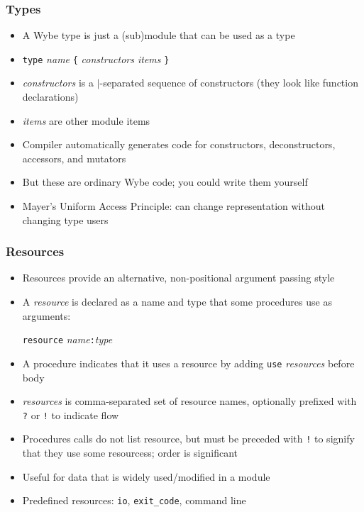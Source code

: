 \documentclass[12pt]{beamer}
\begin{document}
\begin{frame}[fragile]
\frametitle{Types}
\begin{itemize}
\item A Wybe type is just a (sub)module that can be used as a type
\item \texttt{type} \emph{name} \texttt{\{} \emph{constructors items}
  \texttt{\}}
\item \emph{constructors} is a \texttt{$\mid$}-separated sequence of
  constructors (they look like function declarations)
\item \emph{items} are other module items
\item Compiler automatically generates code for constructors, deconstructors,
  accessors, and mutators
\item But these are ordinary Wybe code; you could write them yourself
\item Mayer's Uniform Access Principle: can change representation without
  changing type users
\end{itemize}
\end{frame}


\begin{frame}[fragile]
\frametitle{Resources}
\begin{itemize}
\item Resources provide an alternative, non-positional argument passing style
\item A \emph{resource} is declared as a name and type that some
  procedures use as arguments: \\
  \begin{center}
    \texttt{resource} \emph{name}\texttt{:}\emph{type}
  \end{center}
\item A procedure indicates that it uses a resource by adding
  \texttt{use} \emph{resources} before body
\item \emph{resources} is comma-separated set of resource names,
  optionally prefixed with \texttt{?} or \texttt{!} to indicate flow
\item Procedures calls do not list resource, but must be preceded with
  \texttt{!} to signify that they use some resourcess; order is significant
\item Useful for data that is widely used/modified in a module
\item Predefined resources:  \texttt{io}, \texttt{exit\_code}, command line
\end{itemize}
\end{frame}
\end{document}

